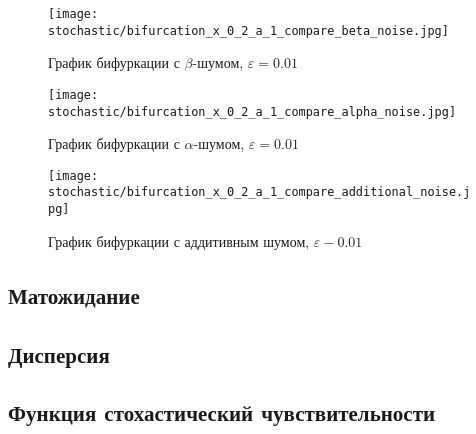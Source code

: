         \begin{figure}
            \centering
            \texttt{[image: stochastic/bifurcation\_x\_0\_2\_a\_1\_compare\_beta\_noise.jpg]}
        
            \captionsetup{justification=centering}
            \caption{График бифуркации с \(\beta\)-шумом, \(\varepsilon = 0.01\)}
            \label{bifurcation_x_0_2_a_1_compare_beta_noise}
        \end{figure}

        \begin{figure}
            \centering
            \texttt{[image: stochastic/bifurcation\_x\_0\_2\_a\_1\_compare\_alpha\_noise.jpg]}
        
            \captionsetup{justification=centering}
            \caption{График бифуркации с \(\alpha\)-шумом, \(\varepsilon = 0.01\)}
            \label{bifurcation_x_0_2_a_1_compare_alpha_noise}
        \end{figure}

        \begin{figure}
            \centering
            \texttt{[image: stochastic/bifurcation\_x\_0\_2\_a\_1\_compare\_additional\_noise.jpg]}
        
            \captionsetup{justification=centering}
            \caption{График бифуркации с аддитивным шумом, \(\varepsilon - 0.01\)}
            \label{bifurcation_x_0_2_a_1_compare_additional_noise}
        \end{figure}


    \subsection{Матожидание}


    \subsection{Дисперсия}


    \subsection{Функция стохастический чувствительности}
    
